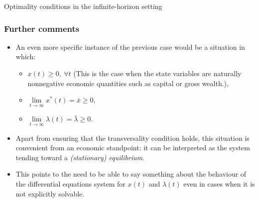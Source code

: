 \documentclass[10pt]{beamer}
\theoremstyle{definition}
\begin{document}
\begin{section}{Optimality conditions in the infinite-horizon setting}
\begin{frame}[fragile]
\frametitle{Further comments}
\begin{itemize}\itemsep1em
\item An even more specific instance of the previous case would be a situation in which:
	\begin{itemize}\itemsep1em
	\item  $ x(t)\geq 0,~\forall t$ (This is the case when the state variables are naturally nonnegative economic quantities such as capital or gross wealth.),
	\item $ \lim\limits_{t\rightarrow \infty} x^*(t) = \bar{x} \geq 0 $,
	\item $ \lim\limits_{t\rightarrow \infty} \lambda(t) = \bar{\lambda} \geq 0 $.
	\end{itemize}
\item Apart from ensuring that the transversality condition holds, this situation is convenient from an economic standpoint: it can be interpreted as the system tending toward a \emph{(stationary) equilibrium}.
\item This points to the need to be able to say something about the behaviour of the differential equations system for $ x(t) $ and $ \lambda(t) $ even in cases when it is not explicitly solvable.
\end{itemize}
\end{frame}
\end{section}
\end{document}

